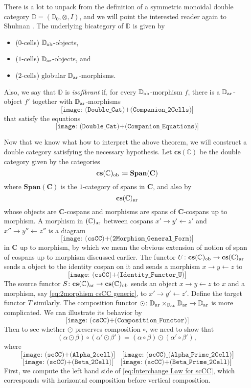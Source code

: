 \documentclass[11pt]{amsart}
\newcommand{\CC}{\mathbb{C}}
\newcommand{\DD}{\mathbb{D}}
\newcommand{\cat}[1]{\mathbf{#1}}
\renewcommand{\t}[1]{\textup{#1}}
\newcommand{\from}{\colon}
\theoremstyle{remark}
\theoremstyle{definition}
\begin{document}
{There is a lot to unpack from the definition of a symmetric monoidal double category $\DD = (\DD_0,\otimes,I)$, and we will point the interested reader again to Shulman \cite[Def.~2.9]{Shul}.  The underlying bicategory of $\DD$ is given by
\begin{itemize}
	\item ($0$-cells) $\DD_\t{ob}$-objects,
	\item ($1$-cells) $\DD_\t{ar}$-objects, and
	\item ($2$-cells) globular $\DD_\t{ar}$-morphisms.
\end{itemize}
Also, we say that $\DD$ is \emph{isofibrant} if, for every $\DD_\t{ob}$-morphism $f$, there is a  $\DD_\t{ar}$-object $f'$ together with $\DD_\t{ar}$-morphisms
\[
	\texttt{[image: (Double\_Cat)+(Companion\_2Cells)]}
\]
that satisfy the equations
\[
	\texttt{[image: (Double\_Cat)+(Companion\_Equations)]}
\]

Now that we know what how to interpret the above theorem, we will construct a double category satisfying the necessary hypothesis. Let $\cat{cs}(\CC)$ be the double category given by the categories 
\[
	\cat{cs}(\CC)_\t{ob} \coloneqq \cat{Span}(\cat{C})
\] 
where $\cat{Span}(\cat{C})$ is the $1$-category of spans in $\cat{C}$, and also by
\[
	\cat{cs}(\CC)_\t{ar}
\]
whose objects are $\cat{C}$-cospans and morphisms are spans of $\cat{C}$-cospans up to morphism. A morphism in $(\CC)_\t{ar}$ between cospans $x' \to y' \gets z'$ and $x'' \to y'' \gets z''$ is a diagram 
\begin{equation}
\label{eq:2morphism csCC generic}
	\texttt{[image: (csCC)+(2Morphism\_General\_Form)]}
\end{equation}
in $\cat{C}$ up to morphism, by which we mean the obvious extension of notion of span of cospans up to morphism discussed earlier.  The functor $U \from \cat{cs}(\CC)_\t{ob} \to \cat{cs}(\CC)_\t{ar}$ sends a object to the identity cospan on it and sends a morphism $x \to y \gets z$ to 
\[
	\texttt{[image: (csCC)+(Identity\_Functor\_U)]}
\]
The source functor $S \from \cat{cs}(\CC)_\t{ar} \to \cat{cs}(\CC)_\t{ob}$ sends an object $x \to y \gets z$ to $x$ and a morphism, say \eqref{eq:2morphism csCC generic}, to $x' \to y' \gets z'$.  Define the target functor $T$ similarly.  The composition functor $\odot \from \DD_\t{ar} \times_{\DD_\t{ob}} \DD_\t{ar} \to \DD_\t{ar}$ is more complicated.  We can illustrate its behavior by
\[
	\texttt{[image: (csCC)+(Composition\_Functor)]}
\]
Then to see whether $\odot$ preserves composition $\circ$, we need to show that 
\begin{equation}
\label{eq:Interchange Law for scCC}
	(\alpha \odot \beta) \circ (\alpha' \odot \beta') = (\alpha \circ \beta) \odot (\alpha' \circ \beta'),
\end{equation} 
where
\[
	\texttt{[image: (scCC)+(Alpha\_2cell)]}
	\quad
	\texttt{[image: (scCC)\_(Alpha\_Prime\_2Cell)]}
\]
\[
	\texttt{[image: (scCC)+(Beta\_2Cell)]}
	\quad
	\texttt{[image: (scCC)+(Beta\_Prime\_2Cell)]}
\]
First, we compute the left hand side of \eqref{eq:Interchange Law for scCC}, which corresponds with horizontal composition before vertical composition. 

}
\end{document}
